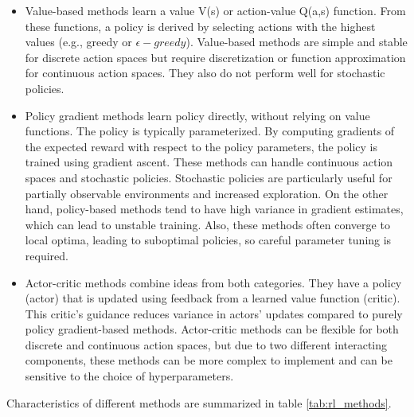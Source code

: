 \begin{itemize}
\item Value-based methods learn a value V(s) or action-value Q(a,s) function. From these functions, a policy is derived by selecting actions with the highest values (e.g., greedy or $\epsilon-greedy$). Value-based methods are simple and stable for discrete action spaces but require discretization or function approximation for continuous action spaces. They also do not perform well for stochastic policies. 
\item Policy gradient methods learn policy directly, without relying on value functions. The policy is typically parameterized. By computing gradients of the expected reward with respect to the policy parameters, the policy is trained using gradient ascent. These methods can handle continuous action spaces and stochastic policies. Stochastic policies are particularly useful for partially observable environments and increased exploration. On the other hand, policy-based methods tend to have high variance in gradient estimates, which can lead to unstable training. Also, these methods often converge to local optima, leading to suboptimal policies, so careful parameter tuning is required.
\item Actor-critic methods combine ideas from both categories. They have a policy (actor) that is updated using feedback from a learned value function (critic). This critic's guidance reduces variance in actors' updates compared to purely policy gradient-based methods. Actor-critic methods can be flexible for both discrete and continuous action spaces, but due to two different interacting components, these methods can be more complex to implement and can be sensitive to the choice of hyperparameters.
\end{itemize}

\bigskip \noindent
Characteristics of different methods are summarized in table \ref{tab:rl_methods}.

